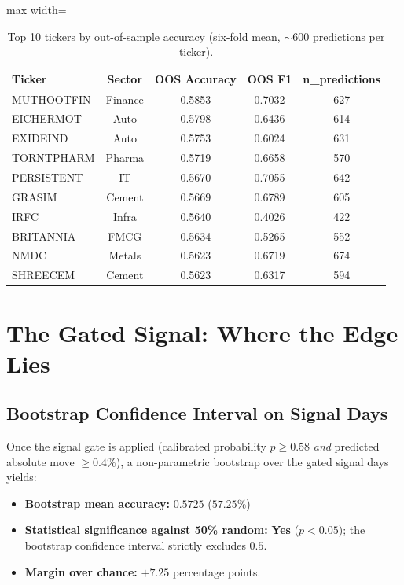 \begin{table}[H]
\centering
\caption{Top 10 tickers by out-of-sample accuracy (six-fold mean, $\sim$600 predictions per ticker).}
\label{tab:top10_oos}
\renewcommand{\arraystretch}{1.3}
\begin{adjustbox}{max width=\textwidth}
\begin{tabular}{l c c c c}
\toprule
\textbf{Ticker} & \textbf{Sector} & \textbf{OOS Accuracy} & \textbf{OOS F1} & \textbf{n\_predictions} \\
\midrule
MUTHOOTFIN  & Finance    & 0.5853 & 0.7032 & 627 \\
EICHERMOT   & Auto       & 0.5798 & 0.6436 & 614 \\
EXIDEIND    & Auto       & 0.5753 & 0.6024 & 631 \\
TORNTPHARM  & Pharma     & 0.5719 & 0.6658 & 570 \\
PERSISTENT  & IT         & 0.5670 & 0.7055 & 642 \\
GRASIM      & Cement     & 0.5669 & 0.6789 & 605 \\
IRFC        & Infra      & 0.5640 & 0.4026 & 422 \\
BRITANNIA   & FMCG       & 0.5634 & 0.5265 & 552 \\
NMDC        & Metals     & 0.5623 & 0.6719 & 674 \\
SHREECEM    & Cement     & 0.5623 & 0.6317 & 594 \\
\bottomrule
\end{tabular}
\end{adjustbox}
\end{table}

\section{The Gated Signal: Where the Edge Lies}

\subsection{Bootstrap Confidence Interval on Signal Days}

Once the signal gate is applied (calibrated probability \(\hat{p} \geq 0.58\) \emph{and} predicted absolute move \(\geq 0.4\%\)), a non-parametric bootstrap over the gated signal days yields:

\begin{itemize}
    \item \textbf{Bootstrap mean accuracy:} $0.5725$ ($57.25\%$)
    \item \textbf{Statistical significance against 50\% random:} \textbf{Yes} ($p < 0.05$); the bootstrap confidence interval strictly excludes $0.5$.
    \item \textbf{Margin over chance:} $+7.25$ percentage points.
\end{itemize}

